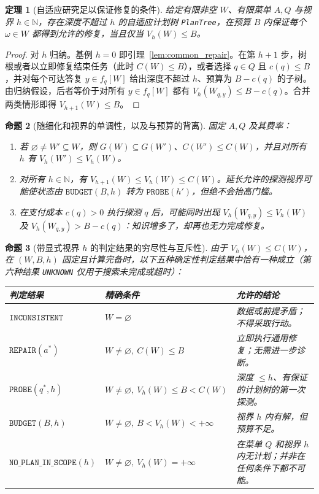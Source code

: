 \documentclass[11pt,a4paper]{article}
\theoremstyle{preprintthm}
\newtheorem{theorem}{定理}[section]
\newtheorem{proposition}[theorem]{命题}
\theoremstyle{preprintdef}
\begin{document}
\begin{theorem}[自适应研究足以保证修复的条件]
\label{thm:minimax_main}
给定有限非空 $W$、有限菜单 $A,Q$ 与视界 $h\in\mathbb{N}$，存在深度不超过 $h$ 的自适应计划树 \texttt{PlanTree}，在预算 $B$ 内保证每个 $\omega\in W$ 都得到允许的修复，当且仅当 $V_h(W)\le B$。
\end{theorem}
\begin{proof}
对 $h$ 归纳。基例 $h=0$ 即引理~\ref{lem:common_repair}。在第 $h+1$ 步，树根或者以立即修复结束任务（此时 $C(W)\le B$），或者选择 $q\in Q$ 且 $c(q)\le B$，并对每个可达答复 $y\in f_q[W]$ 给出深度不超过 $h$、预算为 $B-c(q)$ 的子树。由归纳假设，后者等价于对所有 $y\in f_q[W]$ 都有 $V_h(W_{q,y})\le B-c(q)$。合并两类情形即得 $V_{h+1}(W)\le B$。
\end{proof}

\begin{proposition}[随细化和视界的单调性，以及与预算的背离]
\label{prop:monotonicity}
固定 $A,Q$ 及其费率：
\begin{enumerate}
  \item 若 $\varnothing\ne W'\subseteq W$，则 $G(W)\subseteq G(W')$、$C(W')\le C(W)$，并且对所有 $h$ 有 $V_h(W')\le V_h(W)$。
  \item 对所有 $h\in\mathbb{N}$，有 $V_{h+1}(W)\le V_h(W)\le C(W)$。延长允许的探测视界可能使状态由 $\texttt{BUDGET}(B,h)$ 转为 $\texttt{PROBE}(h')$，但绝不会抬高门槛。
  \item 在支付成本 $c(q)>0$ 执行探测 $q$ 后，可能同时出现 $V_h(W_{q,y})\le V_h(W)$ 及 $V_h(W_{q,y})>B-c(q)$：知识增多了，却再也无力完成修复。
\end{enumerate}
\end{proposition}

\begin{proposition}[带显式视界 $h$ 的判定结果的穷尽性与互斥性]
\label{prop:verdicts}
由于 $V_h(W)\le C(W)$，在 $(W,B,h)$ 固定且计算完备时，以下五种确定性判定结果中恰有一种成立（第六种结果 \texttt{UNKNOWN} 仅用于搜索未完成或超时）：
\begin{center}
\normalfont\footnotesize
\begin{tabularx}{\linewidth}{@{}l l >{\raggedright\arraybackslash}X@{}}
\toprule
\textbf{判定结果} & \textbf{精确条件} & \textbf{允许的结论} \\
\midrule
$\texttt{INCONSISTENT}$ & $W=\varnothing$ & 数据或前提矛盾；不得采取行动。 \\
$\texttt{REPAIR}(a^*)$ & $W\ne\varnothing,\ C(W)\le B$ & 立即执行通用修复；无需进一步诊断。 \\
$\texttt{PROBE}(q^*,h)$ & $W\ne\varnothing,\ V_h(W)\le B<C(W)$ & 深度 $\le h$、有保证的计划树的第一次探测。 \\
$\texttt{BUDGET}(B,h)$ & $W\ne\varnothing,\ B<V_h(W)<+\infty$ & 视界 $h$ 内有解，但预算不足。 \\
$\texttt{NO\_PLAN\_IN\_SCOPE}(h)$ & $W\ne\varnothing,\ V_h(W)=+\infty$ & 在菜单 $Q$ 和视界 $h$ 内无计划；并非在任何条件下都不可能。 \\
\bottomrule
\end{tabularx}
\end{center}
\end{proposition}
\end{document}
